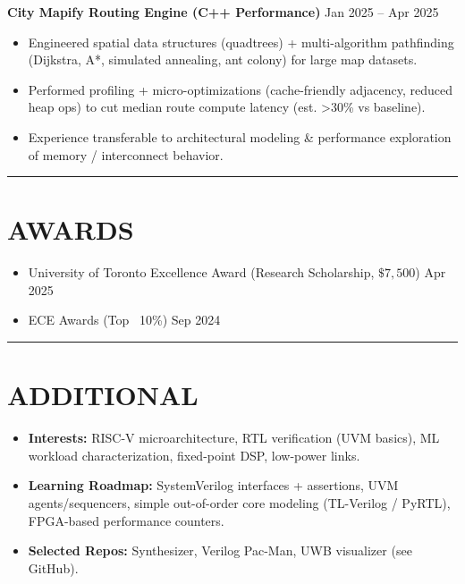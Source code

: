 \documentclass[letterpaper,10pt]{article}
\begin{document}
\textbf{City Mapify Routing Engine (C++ Performance)} \hfill Jan 2025 -- Apr 2025\\
\begin{itemize}[leftmargin=0.2in]
    \item Engineered spatial data structures (quadtrees) + multi-algorithm pathfinding (Dijkstra, A*, simulated annealing, ant colony) for large map datasets.
    \item Performed profiling + micro-optimizations (cache-friendly adjacency, reduced heap ops) to cut median route compute latency (est. >30\% vs baseline).
    \item Experience transferable to architectural modeling \& performance exploration of memory / interconnect behavior.
\end{itemize}

\noindent\rule{\linewidth}{1pt}

\section*{\textbf{AWARDS}}
\begin{itemize}[leftmargin=0.2in]
    \item University of Toronto Excellence Award (Research Scholarship, $\$7,500$) \hfill Apr 2025
    \item ECE Awards (Top ~10\%) \hfill Sep 2024
\end{itemize}

\noindent\rule{\linewidth}{1pt}
\section*{\textbf{ADDITIONAL}}
\begin{itemize}[leftmargin=0.2in]
    \item \textbf{Interests:} RISC-V microarchitecture, RTL verification (UVM basics), ML workload characterization, fixed-point DSP, low-power links.
    \item \textbf{Learning Roadmap:} SystemVerilog interfaces + assertions, UVM agents/sequencers, simple out-of-order core modeling (TL-Verilog / PyRTL), FPGA-based performance counters.
    \item \textbf{Selected Repos:} Synthesizer, Verilog Pac-Man, UWB visualizer (see GitHub).
\end{itemize}
\end{document}
